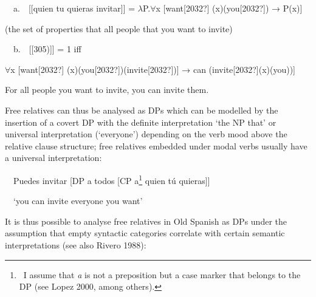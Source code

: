\begin{styleAuthor}
\ \ a.\ \ [[quien tu quieras invitar]] = $\lambda $P.${\forall}$x [want[2032?] (x)(you[2032?]) → P(x)]
\end{styleAuthor}

\begin{styleStandard}
(the set of properties that all people that you want to invite)
\end{styleStandard}

\begin{styleStandard}
\ \ b.\ \ [[305)]] = 1 iff
\end{styleStandard}

\begin{styleListParagraph}
\textmd{${\forall}$x [want[2032?] (x)(you[2032?])(invite[2032?])] → can (invite[2032?](x)(you))]}
\end{styleListParagraph}

\begin{styleListParagraph}
\textmd{For all people you want to invite, you can invite them.}
\end{styleListParagraph}

\begin{styleStandard}
Free relatives can thus be analysed as DPs which can be modelled by the insertion of a covert DP with the definite interpretation ‘the NP that’ or universal interpretation (‘everyone’) depending on the verb mood above the relative clause structure; free relatives embedded under modal verbs usually have a universal interpretation:
\end{styleStandard}

\begin{styleListParagraph}
\textmd{\ \ Puedes invitar [DP a todos [CP a}\footnote{\textrm{\ I assume that }\textrm{\textit{a}}\textrm{ is not a preposition but a case marker that belongs to the DP (see Lopez 2000, among others).}}\textmd{ quien tú quieras]]}
\end{styleListParagraph}

\begin{styleListParagraph}
\textmd{\ \ ‘you can invite everyone you want’}
\end{styleListParagraph}

\begin{styleStandard}
It is thus possible to analyse free relatives in Old Spanish as DPs under the assumption that empty syntactic categories correlate with certain semantic interpretations (see also Rivero 1988):
\end{styleStandard}

